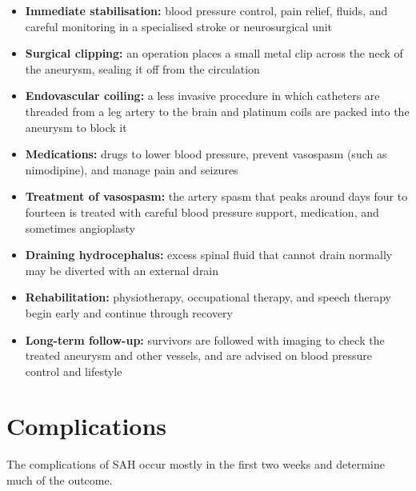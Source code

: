 \begin{itemize}
    \item \textbf{Immediate stabilisation:} blood pressure control, pain relief, fluids, and careful monitoring in a specialised stroke or neurosurgical unit
    \item \textbf{Surgical clipping:} an operation places a small metal clip across the neck of the aneurysm, sealing it off from the circulation
    \item \textbf{Endovascular coiling:} a less invasive procedure in which catheters are threaded from a leg artery to the brain and platinum coils are packed into the aneurysm to block it
    \item \textbf{Medications:} drugs to lower blood pressure, prevent vasospasm (such as nimodipine), and manage pain and seizures
    \item \textbf{Treatment of vasospasm:} the artery spasm that peaks around days four to fourteen is treated with careful blood pressure support, medication, and sometimes angioplasty
    \item \textbf{Draining hydrocephalus:} excess spinal fluid that cannot drain normally may be diverted with an external drain
    \item \textbf{Rehabilitation:} physiotherapy, occupational therapy, and speech therapy begin early and continue through recovery
    \item \textbf{Long-term follow-up:} survivors are followed with imaging to check the treated aneurysm and other vessels, and are advised on blood pressure control and lifestyle
\end{itemize}

\section*{Complications}
The complications of SAH occur mostly in the first two weeks and determine much of the outcome.


